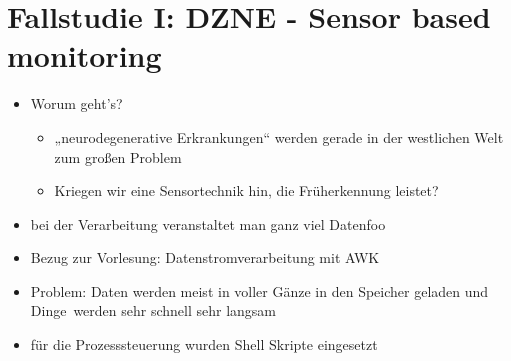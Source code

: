 \documentclass[%
a4paper, %
9pt,               %
leqno,              %
fleqn,              %
]
{scrartcl}
\begin{document}
\section*{Fallstudie I: DZNE - Sensor based monitoring}
\begin{itemize}
\item Worum geht's?
  \begin{itemize}
    \item „neurodegenerative Erkrankungen“ werden gerade in der westlichen Welt
      zum großen Problem
    \item Kriegen wir eine Sensortechnik hin, die Früherkennung leistet?
  \end{itemize}
\item bei der Verarbeitung veranstaltet man ganz viel Datenfoo
\item Bezug zur Vorlesung: Datenstromverarbeitung mit AWK
\item Problem: Daten werden meist in voller Gänze in den Speicher geladen und
  Dinge\texttrademark\ werden sehr schnell sehr langsam
\item für die Prozesssteuerung wurden Shell Skripte eingesetzt
\end{itemize}
\end{document}
